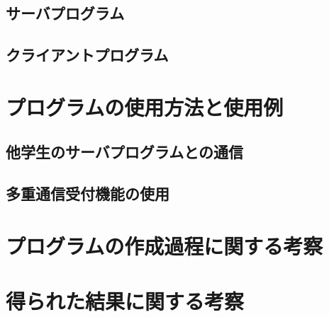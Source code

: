 \subsection{サーバプログラム}

\subsection{クライアントプログラム}

\section{プログラムの使用方法と使用例}

\subsection{他学生のサーバプログラムとの通信}

\subsection{多重通信受付機能の使用}

\section{プログラムの作成過程に関する考察}


\section{得られた結果に関する考察}




